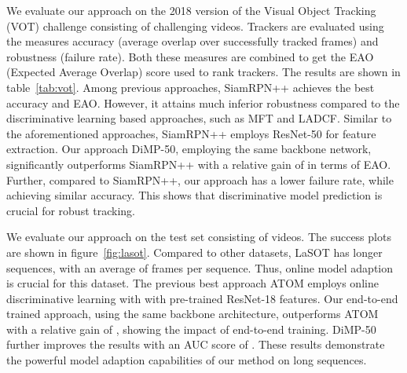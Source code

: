 \documentclass[10pt,twocolumn,letterpaper]{article}
\begin{document}
\begin{table}[!t]
	\centering\vspace{-1mm}
	\vspace{1mm}\caption{State-of-the-art comparison on the VOT2018 dataset in terms of expected average overlap (EAO), accuracy \& robustness.}
	\label{tab:vot}\vspace{-4mm}
\end{table}

 We evaluate our approach on the 2018 version of the Visual Object Tracking (VOT) challenge consisting of  challenging videos. Trackers are evaluated using the measures accuracy (average overlap over successfully tracked frames) and robustness (failure rate). Both these measures are combined to get the EAO (Expected Average Overlap) score used to rank trackers. The results are shown in table~\ref{tab:vot}. Among previous approaches, SiamRPN++ achieves the best accuracy and EAO. However, it attains much inferior robustness compared to the discriminative learning based approaches, such as MFT and LADCF. Similar to the aforementioned approaches, SiamRPN++ employs ResNet-50 for feature extraction. Our approach DiMP-50, employing the same backbone network, significantly outperforms SiamRPN++ with a relative gain of  in terms of EAO. Further, compared to SiamRPN++, our approach has a  lower failure rate, while achieving similar accuracy. 
This shows that discriminative model prediction is crucial for robust tracking.

 We evaluate our approach on the test set consisting of  videos. The success plots are shown in figure~\ref{fig:lasot}. Compared to other datasets, LaSOT has longer sequences, with an average of  frames per sequence. Thus, online model adaption is crucial for this dataset. The previous best approach ATOM \cite{ATOM} employs online discriminative learning with with pre-trained ResNet-18 features. 
Our end-to-end trained approach, using the same backbone architecture, outperforms ATOM with a relative gain of , showing the impact of end-to-end training. DiMP-50 further improves the results with an AUC score of . These results demonstrate the powerful model adaption capabilities of our method on long sequences.
\end{document}
